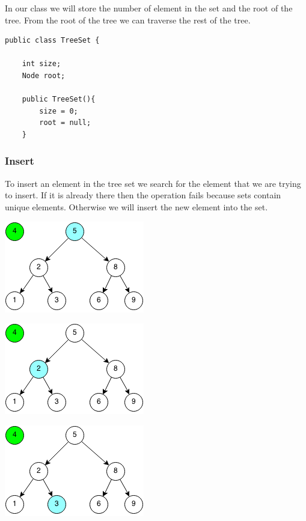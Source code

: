 \documentclass[11pt,oneside]{book}
\makeatletter
\def\maxwidth#1{\ifdim\Gin@nat@width>#1 #1\else\Gin@nat@width\fi}
\makeatother
\begin{document}
In our class we will store the number of element in the set and the root of the tree. From the root of the tree we can traverse the rest of the tree.

\begin{lstlisting}
public class TreeSet {

    int size;
    Node root;
    
    public TreeSet(){
        size = 0;
        root = null;
    }
\end{lstlisting}

\subsubsection{Insert}

To insert an element in the tree set we search for the element that we are trying to insert. If it is already there then the operation fails because sets contain unique elements. Otherwise we will insert the new element into the set.

\vspace{5px}\includegraphics[width=\maxwidth{\textwidth}]{bstinsert.png}

\vspace{5px}\includegraphics[width=\maxwidth{\textwidth}]{bstinsert2.png}

\vspace{5px}\includegraphics[width=\maxwidth{\textwidth}]{bstinsert3.png}
\end{document}
